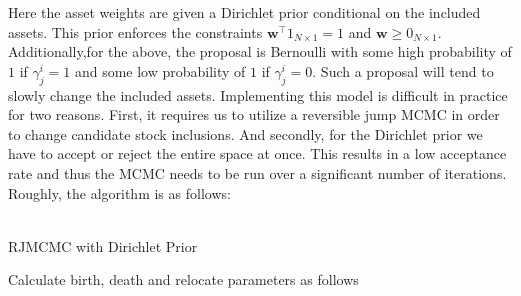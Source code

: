\documentclass[a4paper, 12pt]{article}
\theoremstyle{plain}
\theoremstyle{definition}
\theoremstyle{remark}
\begin{document}
Here the asset weights are given a Dirichlet prior conditional on the included assets.  This prior enforces the constraints $\textbf{w}^\top 1_{N\times 1}=1$ and $\textbf{w}\geq 0_{N\times 1}$. Additionally,for the above, the proposal is Bernoulli with some high probability of $1$ if $\gamma^i_j =1$ and some low probability of $1$ if $\gamma^i_j =0$. Such a proposal will tend to slowly change the included assets. Implementing this model is difficult in practice for two reasons. First, it requires us to utilize a reversible jump MCMC in order to change candidate stock inclusions. And secondly, for the Dirichlet prior we have to accept or reject the entire space at once. This results in a low acceptance rate and thus the MCMC needs to be run over a significant number of iterations. Roughly, the algorithm is as follows:
\\
\\
\begin{algorithm}
\caption{RJMCMC with Dirichlet Prior}
\begin{algorithmic} [1]
\State Calculate birth, death and relocate parameters as follows
	\Else
	\EndIf
	\Else
	\EndIf
 \end{algorithmic}
\end{algorithm}
\end{document}

